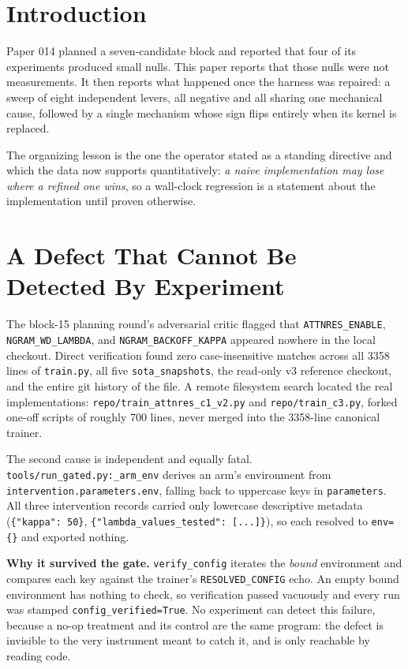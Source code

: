 \documentclass{article}
\begin{document}
\section{Introduction}
Paper 014 planned a seven-candidate block and reported that four of its experiments produced small nulls. This paper reports that those nulls were not measurements. It then reports what happened once the harness was repaired: a sweep of eight independent levers, all negative and all sharing one mechanical cause, followed by a single mechanism whose sign flips entirely when its kernel is replaced.

The organizing lesson is the one the operator stated as a standing directive and which the data now supports quantitatively: \emph{a naive implementation may lose where a refined one wins}, so a wall-clock regression is a statement about the implementation until proven otherwise.

\section{A Defect That Cannot Be Detected By Experiment}
\label{sec:defect}
The block-15 planning round's adversarial critic flagged that \texttt{ATTNRES\_ENABLE}, \texttt{NGRAM\_WD\_LAMBDA}, and \texttt{NGRAM\_BACKOFF\_KAPPA} appeared nowhere in the local checkout. Direct verification found zero case-insensitive matches across all 3358 lines of \texttt{train.py}, all five \texttt{sota\_snapshots}, the read-only v3 reference checkout, and the entire git history of the file. A remote filesystem search located the real implementations: \texttt{repo/train\_attnres\_c1\_v2.py} and \texttt{repo/train\_c3.py}, forked one-off scripts of roughly 700 lines, never merged into the 3358-line canonical trainer.

The second cause is independent and equally fatal. \texttt{tools/run\_gated.py:\_arm\_env} derives an arm's environment from \texttt{intervention.parameters.env}, falling back to uppercase keys in \texttt{parameters}. All three intervention records carried only lowercase descriptive metadata (\texttt{\{"kappa": 50\}}, \texttt{\{"lambda\_values\_tested": [...]\}}), so each resolved to \texttt{env=\{\}} and exported nothing.

\textbf{Why it survived the gate.} \texttt{verify\_config} iterates the \emph{bound} environment and compares each key against the trainer's \texttt{RESOLVED\_CONFIG} echo. An empty bound environment has nothing to check, so verification passed vacuously and every run was stamped \texttt{config\_verified=True}. No experiment can detect this failure, because a no-op treatment and its control are the same program: the defect is invisible to the very instrument meant to catch it, and is only reachable by reading code.
\end{document}

